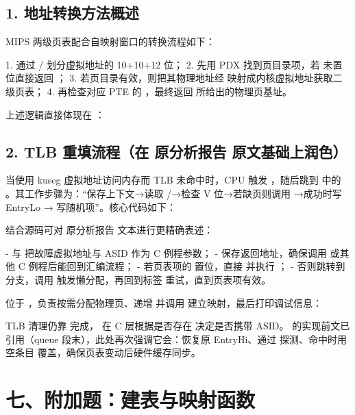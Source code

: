 \documentclass[12pt,oneside]{ctexbook}
\begin{document}
\subsection*{1. 地址转换方法概述}
MIPS 两级页表配合自映射窗口的转换流程如下：

1. 通过 / 划分虚拟地址的 10+10+12 位；
2.  先用 PDX 找到页目录项，若  未置位直接返回 ；
3. 若页目录有效，则把其物理地址经  映射成内核虚拟地址获取二级页表；
4. 再检查对应 PTE 的 ，最终返回  所给出的物理页基址。

上述逻辑直接体现在 ：

\subsection*{2. TLB 重填流程（在 原分析报告 原文基础上润色）}
当使用 kuseg 虚拟地址访问内存而 TLB 未命中时，CPU 触发 ，随后跳到  中的 。其工作步骤为：“保存上下文→读取 /→检查 V 位→若缺页则调用 →成功时写 EntryLo →  写随机项”。核心代码如下：

结合源码可对 原分析报告 文本进行更精确表述：

-  与  把故障虚拟地址与 ASID 作为 C 例程参数；
-  保存返回地址，确保调用  或其他 C 例程后能回到汇编流程；
- 若页表项的  置位，直接  并执行 ；
- 否则跳转到  分支，调用  触发懒分配，再回到标签  重试，直到页表项有效。

 位于 ，负责按需分配物理页、递增  并调用  建立映射，最后打印调试信息：

TLB 清理仍靠  完成， 在 C 层根据是否存在  决定是否携带 ASID。 的实现前文已引用（queue 段末），此处再次强调它会：恢复原 EntryHi、通过  探测、命中时用空条目  覆盖，确保页表变动后硬件缓存同步。
\section*{七、附加题：建表与映射函数}
\end{document}
